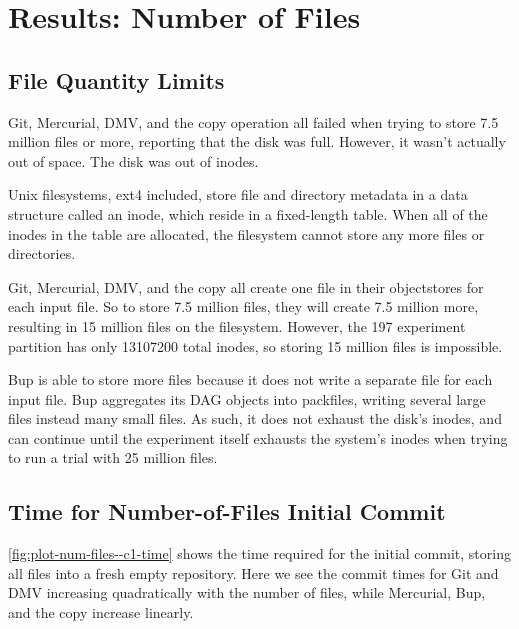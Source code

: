 
\section{Results: Number of Files}
\label{results-num-files}

\subsection{File Quantity Limits}


Git, Mercurial, DMV, and the copy operation all failed when trying to store
\num{7.5} million files or more, reporting that the disk was full. However, it
wasn't actually out of space. The disk was out of \glspl{inode}.


Unix filesystems, ext4 included, store file and directory metadata in a data
structure called an \gls{inode}, which reside in a fixed-length
table\cite{unix_timesharing_system}. When all of the \glspl{inode} in the table
are allocated, the filesystem cannot store any more files or directories.

Git, Mercurial, DMV, and the copy all create one file in their
\glspl{objectstore} for each input file. So to store \num{7.5} million files,
they will create \num{7.5} million more, resulting in \num{15} million files on
the filesystem. However, the \SI{197}{\gib} experiment partition has only
\num{13107200} total inodes, so storing \num{15} million files is impossible.

Bup is able to store more files because it does not write a separate file for
each input file. Bup aggregates its DAG objects into \glspl{packfile}, writing
several large files instead many small files. As such, it does not exhaust the
disk's inodes, and can continue until the experiment itself exhausts the
system's inodes when trying to run a trial with \num{25} million files.

%


\subsection{Time for Number-of-Files Initial Commit}
\label{results-num-files--c1-time}

\autoref{fig:plot-num-files--c1-time} shows the time required for the initial
\gls{commit}, storing all files into a fresh empty repository. Here we see the
commit times for Git and DMV increasing quadratically with the number of files,
while Mercurial, Bup, and the copy increase linearly.

